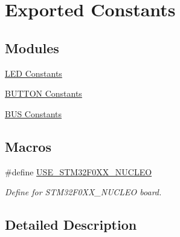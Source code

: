 \hypertarget{group___s_t_m32_f0_x_x___n_u_c_l_e_o___exported___constants}{}\section{Exported Constants}
\label{group___s_t_m32_f0_x_x___n_u_c_l_e_o___exported___constants}
\subsection*{Modules}
\begin{DoxyCompactItemize}
\item 
\hyperlink{group___s_t_m32_f0_x_x___n_u_c_l_e_o___l_e_d}{L\+E\+D Constants}
\item 
\hyperlink{group___s_t_m32_f0_x_x___n_u_c_l_e_o___b_u_t_t_o_n}{B\+U\+T\+T\+O\+N Constants}
\item 
\hyperlink{group___s_t_m32_f0_x_x___n_u_c_l_e_o___b_u_s}{B\+U\+S Constants}
\end{DoxyCompactItemize}
\subsection*{Macros}
\begin{DoxyCompactItemize}
\item 
\mbox{\label{group___s_t_m32_f0_x_x___n_u_c_l_e_o___exported___constants_gad2f6d6c42023480aedfdba8f553eb938}} 
\#define \hyperlink{group___s_t_m32_f0_x_x___n_u_c_l_e_o___exported___constants_gad2f6d6c42023480aedfdba8f553eb938}{U\+S\+E\+\_\+\+S\+T\+M32\+F0\+X\+X\+\_\+\+N\+U\+C\+L\+EO}
\begin{DoxyCompactList}\small\item\em Define for S\+T\+M32\+F0\+X\+X\+\_\+\+N\+U\+C\+L\+EO board. \end{DoxyCompactList}\end{DoxyCompactItemize}


\subsection{Detailed Description}
